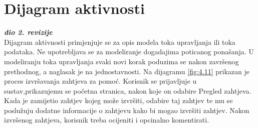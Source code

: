 \newpage
		\section{Dijagram aktivnosti}
			
			\textbf{\textit{dio 2. revizije}}\\
			
			\text Dijagram aktivnosti primjenjuje se za opis modela toka upravljanja ili toka podataka. Ne upotrebljava se za modeliranje dogadajima poticanog ponašanja. U modeliranju toka upravljanja svaki novi korak poduzima se nakon završenog prethodnog, a naglasak je na jednostavnosti. Na dijagramu \ref{fig:4.11} prikazan je proces izvršavanja zahtjeva za pomoć. Korisnik se prijavljuje u sustav,prikazujemu se početna stranica, nakon koje on odabire Pregled zahtjeva. Kada je zamijetio zahtjev kojeg može izvršiti, odabire taj zahtjev te mu se poslužuju dodatne informacije o zahtjevu kako bi mogao izvršiti zahtjev. Nakon izvršenog zahtjeva, korisnik treba ocijeniti i opcinalno komentirati.
			
